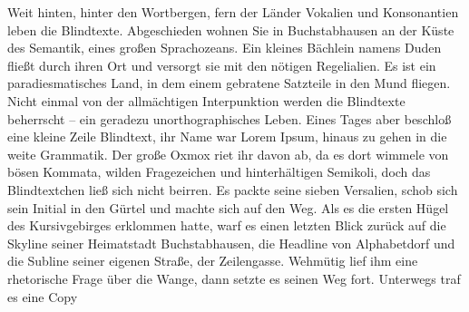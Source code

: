 \begin{zusammenfassung}
  Weit hinten, hinter den Wortbergen, fern der Länder Vokalien und Konsonantien
  leben die Blindtexte. Abgeschieden wohnen Sie in Buchstabhausen an der Küste
  des Semantik, eines großen Sprachozeans. Ein kleines Bächlein namens Duden
  fließt durch ihren Ort und versorgt sie mit den nötigen Regelialien. Es ist
  ein paradiesmatisches Land, in dem einem gebratene Satzteile in den Mund
  fliegen. Nicht einmal von der allmächtigen Interpunktion werden die
  Blindtexte beherrscht – ein geradezu unorthographisches Leben. Eines Tages
  aber beschloß eine kleine Zeile Blindtext, ihr Name war Lorem Ipsum, hinaus
  zu gehen in die weite Grammatik. Der große Oxmox riet ihr davon ab, da es
  dort wimmele von bösen Kommata, wilden Fragezeichen und hinterhältigen
  Semikoli, doch das Blindtextchen ließ sich nicht beirren. Es packte seine
  sieben Versalien, schob sich sein Initial in den Gürtel und machte sich auf
  den Weg. Als es die ersten Hügel des Kursivgebirges erklommen hatte, warf es
  einen letzten Blick zurück auf die Skyline seiner Heimatstadt Buchstabhausen,
  die Headline von Alphabetdorf und die Subline seiner eigenen Straße, der
  Zeilengasse. Wehmütig lief ihm eine rhetorische Frage über die Wange, dann
  setzte es seinen Weg fort. Unterwegs traf es eine Copy
\end{zusammenfassung}

